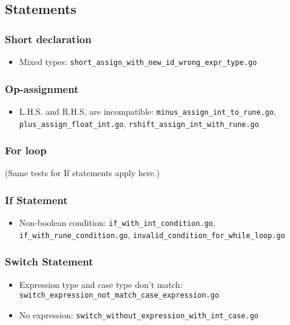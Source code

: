 \documentclass{article}
\begin{document}
\subsection{Statements}

\subsubsection{Short declaration}

\begin{itemize}
\item Mixed types: \texttt{short\_assign\_with\_new\_id\_wrong\_expr\_type.go}
\end{itemize}

\subsubsection{Op-assignment}

\begin{itemize}
\item L.H.S. and R.H.S. are incompatible: \texttt{minus\_assign\_int\_to\_rune.go}, \texttt{plus\_assign\_float\_int.go}, \texttt{rshift\_assign\_int\_with\_rune.go}
\end{itemize}

\subsubsection{For loop}

(Same tests for If statements apply here.)

\subsubsection{If Statement}

\begin{itemize}
\item Non-boolean condition: \texttt{if\_with\_int\_condition.go}, \texttt{if\_with\_rune\_condition.go}, \texttt{invalid\_condition\_for\_while\_loop.go}
\end{itemize}

\subsubsection{Switch Statement}

\begin{itemize}
\item Expression type and case type don't match: \texttt{switch\_expression\_not\_match\_case\_expression.go}
\item No expression: \texttt{switch\_without\_expression\_with\_int\_case.go}
\end{itemize}
\end{document}

